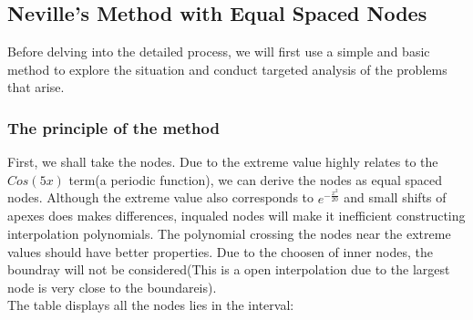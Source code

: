 \documentclass[11pt]{article}
\begin{document}
\subsection{Neville's Method with Equal Spaced Nodes}
Before delving into the detailed process, we will first use a simple and basic method to explore the situation and conduct targeted analysis of the problems that arise.
\subsubsection{The principle of the method}
First, we shall take the nodes. Due to the extreme value highly relates to the $Cos(5x)$ term(a periodic function), we can derive the nodes as 
equal spaced nodes. Although the extreme value also corresponds to $e^{-\frac{x^{2}}{20}}$ and small shifts of apexes does makes differences, 
inqualed nodes will make it inefficient constructing interpolation polynomials.
The polynomial crossing the nodes near the extreme values should have better properties. Due to the choosen of inner nodes, the boundray will not 
be considered(This is a open interpolation due to the largest node is very close to the boundareis).\\
The table displays all the nodes lies in the interval:\\ 
\end{document}
